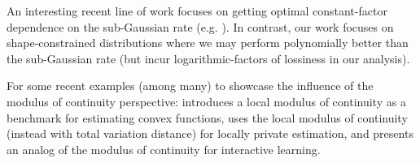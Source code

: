 An interesting recent line of work focuses on getting optimal constant-factor dependence on the sub-Gaussian rate (e.g. \cite{catoni2012challenging,lee2022optimal,lee2022optimal2,gupta2024beyond}). In contrast, our work focuses on shape-constrained distributions where we may perform polynomially better than the sub-Gaussian rate (but incur logarithmic-factors of lossiness in our analysis).

For some recent examples (among many) to showcase the influence of the modulus of continuity perspective: \cite{cai2015framework} introduces a local modulus of continuity as a benchmark for estimating convex functions, \cite{duchi2024right} uses the local modulus of continuity (instead with total variation distance) for locally private estimation, and \cite{foster2021statistical} presents an analog of the modulus of continuity for interactive learning.






